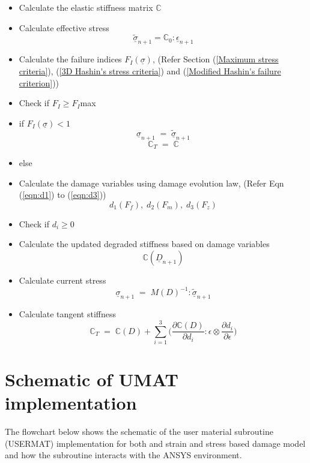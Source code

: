 \documentclass[a4paper,12pt,twoside]{report}
\begin{document}
\begin{itemize}
\item Calculate the elastic stiffness matrix  \textbf{$\mathbb{C}$}
\item Calculate effective stress \textbf{$$\underline{\tilde{\sigma}}_{n+1} = \mathbb{C}_{0} : \underline{\epsilon}_{n+1} $$}
\item Calculate the failure indices \textbf{$F_{I}(\underline{\sigma})$},\;\; (Refer Section (\ref{Maximum stress criteria}), (\ref{3D Hashin's stress criteria}) and (\ref{Modified Hashin's failure criterion}))
\item[] Check if $F_{I} \geq F_{I}$max
\item if \textbf{$F_{I}(\underline{\sigma})<1$} \textbf{$$\underline{\sigma}_{n+1} \; = \; \underline{\tilde{\sigma}}_{n+1} $$} \textbf{$$\mathbb{C}_{T} \; = \; \mathbb{C}$$}
\item else
   	
\item[]  Calculate the damage variables using damage evolution law, \;\; (Refer Eqn (\ref{eqn:d1}) to (\ref{eqn:d3}))  \textbf{$$d_{1}(F_{f}),\;d_{2}(F_{m}),\;d_{3}(F_{z})$$}  	
\item[]  Check if $d_{i} \geq 0 $ 
\item[]  Calculate the updated degraded stiffness based on damage variables \textbf{$$\mathbb{C}(\underline{D}_{n+1})$$}
\item[]  Calculate current stress  \textbf{$$\underline{\sigma}_{n+1} \; = \;  M(D)^{-1}:\underline{\tilde{\sigma}}_{n+1} $$}
\item[] Calculate tangent stiffness \textbf{$$\mathbb{C}_{T}  \; = \;\mathbb{C}(D) + \sum_{i = 1}^{3} \Big( \frac{\partial \mathbb{C}(D) }{\partial d_{i}} : \epsilon \otimes \frac{\partial d_{i}}{\partial \epsilon }\Big)$$}
	
\end{itemize} 


\section{Schematic of UMAT implementation}
\indent\indent\indent The flowchart below shows the schematic of the user material subroutine (USERMAT) implementation for both and strain and stress based damage model and how the subroutine interacts with the ANSYS environment.
\end{document}
